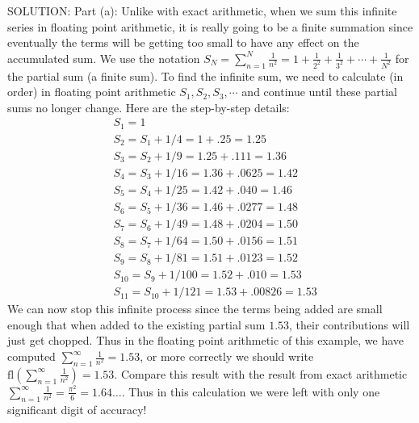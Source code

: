 \documentclass[../main.tex]{subfiles}
\begin{document}
SOLUTION: Part (a): Unlike with exact arithmetic, when we sum this infinite series in floating point arithmetic, it is really going to be a finite summation since eventually the terms will be getting too small to have any effect on the accumulated sum. We use the notation $S_{N}=\sum_{n=1}^{N} \frac{1}{n^{2}}=1+\frac{1}{2^{2}}+\frac{1}{3^{2}}+\cdots+\frac{1}{N^{2}}$ for the partial sum (a finite sum). To find the infinite sum, we need to calculate (in order) in floating point arithmetic $S_{1}, S_{2}, S_{3}, \cdots$ and continue until these partial sums no longer change. Here are the step-by-step details:
$$
\begin{aligned}
&S_{1}=1 \\
&S_{2}=S_{1}+1 / 4=1+.25=1.25 \\
&S_{3}=S_{2}+1 / 9=1.25+.111=1.36 \\
&S_{4}=S_{3}+1 / 16=1.36+.0625=1.42 \\
&S_{5}=S_{4}+1 / 25=1.42+.040=1.46 \\
&S_{6}=S_{5}+1 / 36=1.46+.0277=1.48 \\
&S_{7}=S_{6}+1 / 49=1.48+.0204=1.50 \\
&S_{8}=S_{7}+1 / 64=1.50+.0156=1.51 \\
&S_{9}=S_{8}+1 / 81=1.51+.0123=1.52 \\
&S_{10}=S_{9}+1 / 100=1.52+.010=1.53 \\
&S_{11}=S_{10}+1 / 121=1.53+.00826=1.53
\end{aligned}
$$
We can now stop this infinite process since the terms being added are small enough that when added to the existing partial sum $1.53$, their contributions will just get chopped. Thus in the floating point arithmetic of this example, we have computed $\sum_{n=1}^{\infty} \frac{1}{n^{2}}=1.53$, or more correctly we should write $\mathrm{fl}\left(\sum_{n=1}^{\infty} \frac{1}{n^{2}}\right)=1.53$. Compare this result with the result from exact arithmetic $\sum_{n=1}^{\infty} \frac{1}{n^{2}}=\frac{\pi^{2}}{6}=1.64 \ldots$. Thus in this calculation we were left with only one significant digit of accuracy!
\end{document}

